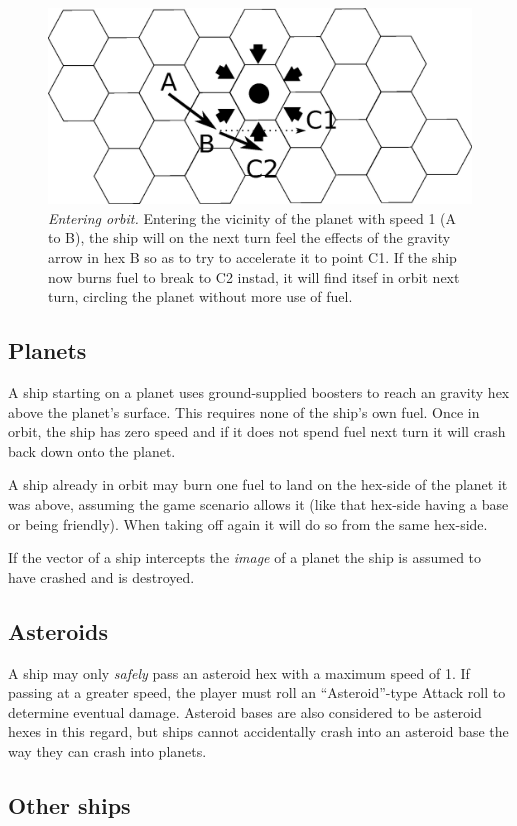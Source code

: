 \documentclass[a4paper,12pt,notitlepage,twocolumn]{article}
\begin{document}
\begin{figure}[h!]\centering  
  \includegraphics[width=0.5 \textwidth]{data/move_9.eps}  
  \caption{
\label{fig:9}\footnotesize \emph{Entering orbit.} Entering the vicinity of the
planet with speed 1 (A to B), the ship will on the next turn feel the effects of the
gravity arrow in hex B so as to try to accelerate it to point C1. If
the ship now burns fuel to break to C2 instad, it will find itsef in
orbit next turn, circling the planet without more use of fuel.} 
\end{figure}

\subsection{Planets}

A ship starting on a planet uses ground-supplied boosters to reach an
gravity hex above the planet's surface. This requires none of the ship's
own fuel. Once in orbit, the ship has zero speed and if it does not
spend fuel next turn it will crash back down onto the planet. 

A ship already in orbit may burn one fuel to land on the hex-side of the
planet it was above, assuming the game scenario allows it (like that
hex-side having a base or being friendly). When taking off again it
will do so from the same hex-side.  

If the vector of a ship intercepts the \emph{image} of a planet the ship is
assumed to have crashed and is destroyed.

\subsection{Asteroids}

A ship may only \emph{safely} pass an asteroid hex with a maximum
speed of 1. If passing at a greater speed, the player must roll
an ``Asteroid''-type Attack roll to determine eventual damage. Asteroid bases are 
also considered to be asteroid hexes in
this regard, but ships cannot accidentally crash into an asteroid base
the way they can crash into planets.  


\subsection{Other ships}
\end{document}
